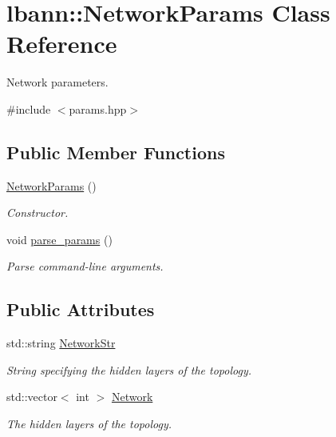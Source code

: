 \hypertarget{classlbann_1_1NetworkParams}{}\section{lbann\+:\+:Network\+Params Class Reference}
\label{classlbann_1_1NetworkParams}


Network parameters.  




{\ttfamily \#include $<$params.\+hpp$>$}

\subsection*{Public Member Functions}
\begin{DoxyCompactItemize}
\item 
\hyperlink{classlbann_1_1NetworkParams_ad915e046e5e001f37a5d0124809dd07b}{Network\+Params} ()
\begin{DoxyCompactList}\small\item\em Constructor. \end{DoxyCompactList}\item 
void \hyperlink{classlbann_1_1NetworkParams_a9b6f7e0330547330238085f3fd0e3702}{parse\+\_\+params} ()
\begin{DoxyCompactList}\small\item\em Parse command-\/line arguments. \end{DoxyCompactList}\end{DoxyCompactItemize}
\subsection*{Public Attributes}
\begin{DoxyCompactItemize}
\item 
std\+::string \hyperlink{classlbann_1_1NetworkParams_a8b503690c7475582b5a843f0959c3f2a}{Network\+Str}
\begin{DoxyCompactList}\small\item\em String specifying the hidden layers of the topology. \end{DoxyCompactList}\item 
std\+::vector$<$ int $>$ \hyperlink{classlbann_1_1NetworkParams_a17ccde99dec30d27c836a23f003fa34d}{Network}
\begin{DoxyCompactList}\small\item\em The hidden layers of the topology. \end{DoxyCompactList}\end{DoxyCompactItemize}
